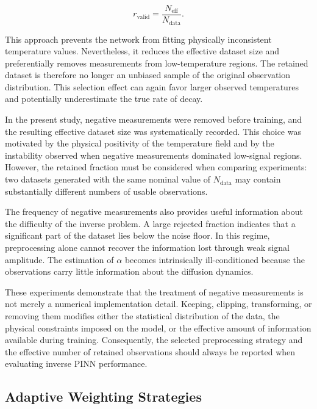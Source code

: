 \begin{equation}
r_{\mathrm{valid}}
=
\frac{N_{\mathrm{eff}}}{N_{\mathrm{data}}}.
\end{equation}

This approach prevents the network from fitting physically inconsistent temperature values. Nevertheless, it reduces the effective dataset size and preferentially removes measurements from low-temperature regions. The retained dataset is therefore no longer an unbiased sample of the original observation distribution. This selection effect can again favor larger observed temperatures and potentially underestimate the true rate of decay.

In the present study, negative measurements were removed before training, and the resulting effective dataset size was systematically recorded. This choice was motivated by the physical positivity of the temperature field and by the instability observed when negative measurements dominated low-signal regions. However, the retained fraction must be considered when comparing experiments: two datasets generated with the same nominal value of $N_{\mathrm{data}}$ may contain substantially different numbers of usable observations.

The frequency of negative measurements also provides useful information about the difficulty of the inverse problem. A large rejected fraction indicates that a significant part of the dataset lies below the noise floor. In this regime, preprocessing alone cannot recover the information lost through weak signal amplitude. The estimation of $\alpha$ becomes intrinsically ill-conditioned because the observations carry little information about the diffusion dynamics.

These experiments demonstrate that the treatment of negative measurements is not merely a numerical implementation detail. Keeping, clipping, transforming, or removing them modifies either the statistical distribution of the data, the physical constraints imposed on the model, or the effective amount of information available during training. Consequently, the selected preprocessing strategy and the effective number of retained observations should always be reported when evaluating inverse PINN performance.

\subsection{Adaptive Weighting Strategies}

